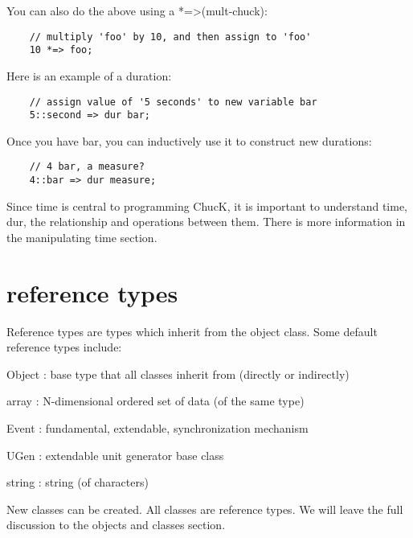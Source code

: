 You can also do the above using a *=\textgreater (mult-chuck):
\begin{verbatim}
    // multiply 'foo' by 10, and then assign to 'foo'
    10 *=> foo;
\end{verbatim}

Here is an example of a duration:
\begin{verbatim}
    // assign value of '5 seconds' to new variable bar
    5::second => dur bar;
\end{verbatim}

Once you have bar, you can inductively use it to construct new durations:
\begin{verbatim}
    // 4 bar, a measure?
    4::bar => dur measure;
\end{verbatim}

 Since time is central to programming ChucK, it is important to understand time, dur, the relationship and operations between them. There is more information in the manipulating time section.
 
\section{reference types}

Reference types are types which inherit from the object class. Some default reference types include:
\begin{chuckitemize}
\item  Object : base type that all classes inherit from (directly or indirectly)
\item  array : N-dimensional ordered set of data (of the same type)
\item  Event : fundamental, extendable, synchronization mechanism
\item  UGen : extendable unit generator base class
\item  string : string (of characters)
\end{chuckitemize}
 New classes can be created. All classes are reference types. We will leave the full discussion to the objects and classes section.